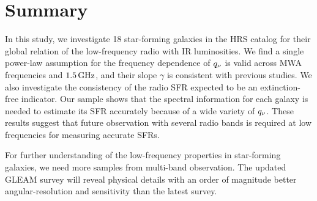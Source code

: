 \chapter{Summary}
%
%

In this study, we investigate 18 star-forming galaxies in the HRS catalog for their global relation of the low-frequency radio with IR luminosities.
We find a single power-law assumption for the frequency dependence of $q_{\nu}$ is valid across MWA frequencies and $1.5\,\mathrm{GHz}$, and their slope $\gamma$ is consistent with previous studies.
We also investigate the consistency of the radio SFR expected to be an extinction-free indicator.
Our sample shows that the spectral information for each galaxy is needed to estimate its SFR accurately because of a wide variety of $q_{\nu}$.
These results suggest that future observation with several radio bands is required at low frequencies for measuring accurate SFRs.

For further understanding of the low-frequency properties in star-forming galaxies, we need more samples from multi-band observation.
The updated GLEAM survey will reveal physical details with an order of magnitude better angular-resolution and sensitivity than the latest survey.
